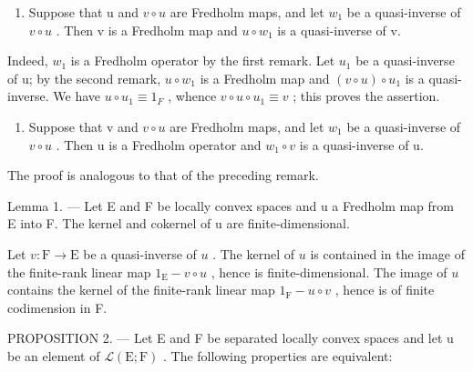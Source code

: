\begin{enumerate}
\def\labelenumi{\arabic{enumi})}
\setcounter{enumi}{2}
\tightlist
\item
  Suppose that u and \(v \circ u\) are Fredholm maps, and let \(w_{1}\) be a quasi-inverse of \(v \circ u\) . Then v is a Fredholm map and \(u \circ w_{1}\) is a quasi-inverse of v.
\end{enumerate}

Indeed, \(w_{1}\) is a Fredholm operator by the first remark. Let \(u_{1}\) be a quasi-inverse of u; by the second remark, \(u \circ w_{1}\) is a Fredholm map and \((v \circ u) \circ u_{1}\) is a quasi-inverse. We have \(u \circ u_{1} \equiv 1_{F}\) , whence \(v \circ u \circ u_{1} \equiv v\) ; this proves the assertion.

\begin{enumerate}
\def\labelenumi{\arabic{enumi})}
\setcounter{enumi}{3}
\tightlist
\item
  Suppose that v and \(v \circ u\) are Fredholm maps, and let \(w_{1}\) be a quasi-inverse of \(v \circ u\) . Then u is a Fredholm operator and \(w_{1} \circ v\) is a quasi-inverse of u.
\end{enumerate}

The proof is analogous to that of the preceding remark.

Lemma 1. --- Let E and F be locally convex spaces and u a Fredholm map from E into F. The kernel and cokernel of u are finite-dimensional.

Let \(v \colon \mathrm{F} \to \mathrm{E}\) be a quasi-inverse of \(u\) . The kernel of \(u\) is contained in the image of the finite-rank linear map \(1_{\mathrm{E}} - v \circ u\) , hence is finite-dimensional. The image of \(u\) contains the kernel of the finite-rank linear map \(1_{\mathrm{F}} - u \circ v\) , hence is of finite codimension in F.

PROPOSITION 2. — Let E and F be separated locally convex spaces and let u be an element of \(\mathcal{L}(\mathrm{E};\mathrm{F})\) . The following properties are equivalent:

